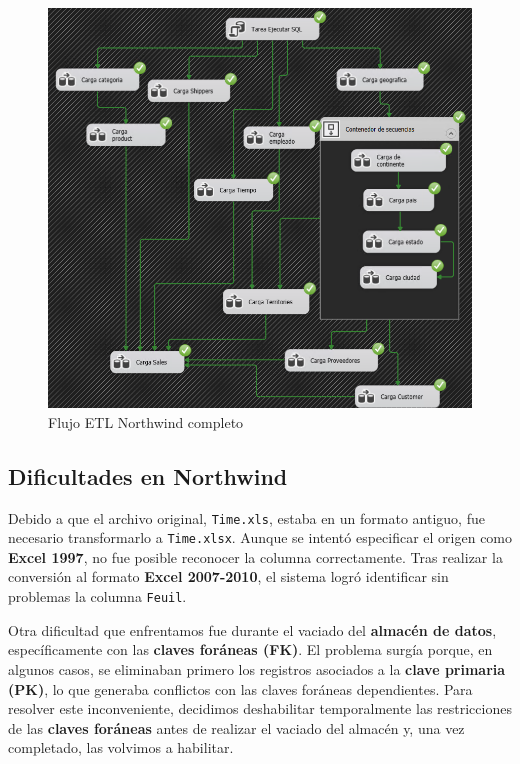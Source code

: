 \documentclass[12pt, a4paper, twoside]{article}
\begin{document}
	
	\begin{figure}[H]
		\centering
		\includegraphics[width=1\textwidth]{image/flujo_north_completo.png}
		\caption{Flujo ETL Northwind completo}
		\label{fig:8}
	\end{figure}
	

	
	\subsection{Dificultades en Northwind}
	
	Debido a que el archivo original, \texttt{Time.xls}, estaba en un formato antiguo, fue necesario transformarlo a \texttt{Time.xlsx}. Aunque se intentó especificar el origen como \textbf{Excel 1997}, no fue posible reconocer la columna correctamente. Tras realizar la conversión al formato \textbf{Excel 2007-2010}, el sistema logró identificar sin problemas la columna \texttt{Feuil}.
	
	Otra dificultad que enfrentamos fue durante el vaciado del \textbf{almacén de datos}, específicamente con las \textbf{claves foráneas (FK)}. El problema surgía porque, en algunos casos, se eliminaban primero los registros asociados a la \textbf{clave primaria (PK)}, lo que generaba conflictos con las claves foráneas dependientes. Para resolver este inconveniente, decidimos deshabilitar temporalmente las restricciones de las \textbf{claves foráneas} antes de realizar el vaciado del almacén y, una vez completado, las volvimos a habilitar.
	
\end{document}

